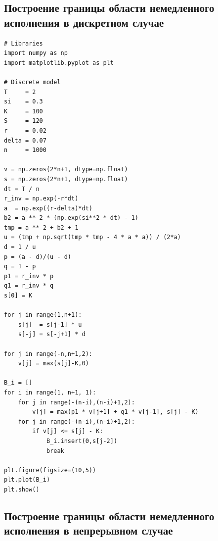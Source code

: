 \documentclass[oneside,final,12pt]{article}
\begin{document}
\subsection*{Построение границы области немедленного исполнения в дискретном случае}

\lstset{language=Python}
\begin{lstlisting}
# Libraries
import numpy as np
import matplotlib.pyplot as plt

# Discrete model
T     = 2
si    = 0.3
K     = 100
S     = 120
r     = 0.02
delta = 0.07
n     = 1000

v = np.zeros(2*n+1, dtype=np.float)
s = np.zeros(2*n+1, dtype=np.float)
dt = T / n
r_inv = np.exp(-r*dt)
a  = np.exp((r-delta)*dt)
b2 = a ** 2 * (np.exp(si**2 * dt) - 1)
tmp = a ** 2 + b2 + 1
u = (tmp + np.sqrt(tmp * tmp - 4 * a * a)) / (2*a)
d = 1 / u
p = (a - d)/(u - d)
q = 1 - p
p1 = r_inv * p
q1 = r_inv * q
s[0] = K

for j in range(1,n+1):
    s[j]  = s[j-1] * u
    s[-j] = s[-j+1] * d

for j in range(-n,n+1,2):
    v[j] = max(s[j]-K,0)
    
B_i = []          
for i in range(1, n+1, 1):
    for j in range(-(n-i),(n-i)+1,2):
        v[j] = max(p1 * v[j+1] + q1 * v[j-1], s[j] - K)
    for j in range(-(n-i),(n-i)+1,2):
        if v[j] <= s[j] - K:
            B_i.insert(0,s[j-2])
            break

plt.figure(figsize=(10,5))
plt.plot(B_i)
plt.show()
\end{lstlisting}

\newpage
{}
\subsection*{Построение границы области немедленного исполнения в непрерывном случае}
\end{document}
